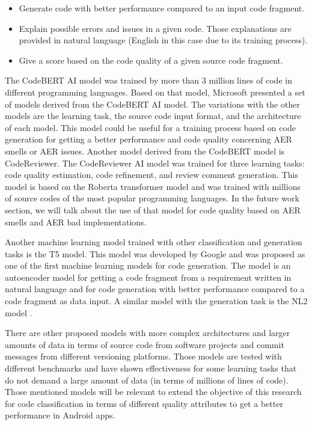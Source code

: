 \begin{itemize}
	\item Generate code with better performance compared to an input code fragment.
	\item Explain possible errors and issues in a given code. Those explanations are provided in natural language (English in this case due to its training process).
	\item Give a score based on the code quality of a given source code fragment.
\end{itemize}

The CodeBERT AI model was trained by more than 3 million lines of code in different programming languages. Based on that model, Microsoft presented a set of models derived from the CodeBERT AI model. The variations with the other models are the learning task, the source code input format, and the architecture of each model. This model could be useful for a training process based on code generation for getting a better performance and code quality concerning AER smells or AER issues.
Another model derived from the CodeBERT model is CodeReviewer. The CodeReviewer AI model was trained for three learning tasks: code quality estimation, code refinement, and review comment generation. This model is based on the Roberta transformer model and was trained with millions of source codes of the most popular programming languages. In the future work section, we will talk about the use of that model for code quality based on AER smells and AER bad implementations.


Another machine learning model trained with other classification and generation tasks is the T5 model. This model was developed by Google and was proposed as one of the first machine learning models for code generation. The model is an autoencoder model for getting a code fragment from a requirement written in natural language and for code generation with better performance compared to a code fragment as data input. A similar model with the generation task is the NL2 model \citet{nl2_model}.

There are other proposed models with more complex architectures and larger amounts of data in terms of source code from software projects and commit messages from different versioning platforms. Those models are tested with different benchmarks and have shown effectiveness for some learning tasks that do not demand a large amount of data (in terms of millions of lines of code). Those mentioned models will be relevant to extend the objective of this research for code classification in terms of different quality attributes to get a better performance in Android apps.

